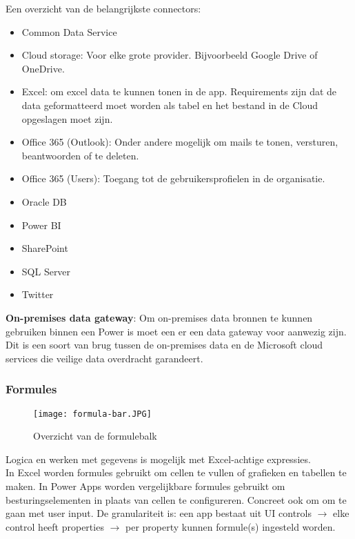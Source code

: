 Een overzicht van de belangrijkste connectors:
\begin{itemize}
    \item Common Data Service
    \item Cloud storage: Voor elke grote provider. Bijvoorbeeld Google Drive of OneDrive.
    \item Excel: om excel data te kunnen tonen in de app. Requirements zijn dat de data geformatteerd moet worden als tabel en het bestand in de Cloud opgeslagen moet zijn.
    \item Office 365 (Outlook): Onder andere mogelijk om mails te tonen, versturen, beantwoorden of te deleten.
    \item Office 365 (Users): Toegang tot de gebruikersprofielen in de organisatie.
    \item Oracle DB
    \item Power BI
    \item SharePoint
    \item SQL Server
    \item Twitter
\end{itemize} \autocite{MicrosoftDocs2020b}

\textbf{On-premises data gateway}: Om on-premises data bronnen te kunnen gebruiken binnen een Power is moet een er een data gateway voor aanwezig zijn. Dit is een soort van brug tussen de on-premises data en de Microsoft cloud services die veilige data overdracht garandeert. \autocite{MicrosoftDocs2019b}

\subsubsection{Formules}

\begin{figure}[h!]
    \texttt{[image: formula-bar.JPG]}
    \caption{Overzicht van de formulebalk \autocite{MicrosoftDocs2019c}}
    \label{fig:msformulebalk}
\end{figure}

Logica en werken met gegevens is mogelijk met Excel-achtige expressies.\\
In Excel worden formules gebruikt om cellen te vullen of grafieken en tabellen te maken. In Power Apps worden vergelijkbare formules gebruikt om besturingselementen in plaats van cellen te configureren. Concreet ook om om te gaan met user input. De granulariteit is: een app bestaat uit UI controls $\rightarrow$ elke control heeft properties $\rightarrow$ per property kunnen formule(s) ingesteld worden. \autocite{MicrosoftDocs2019c}

